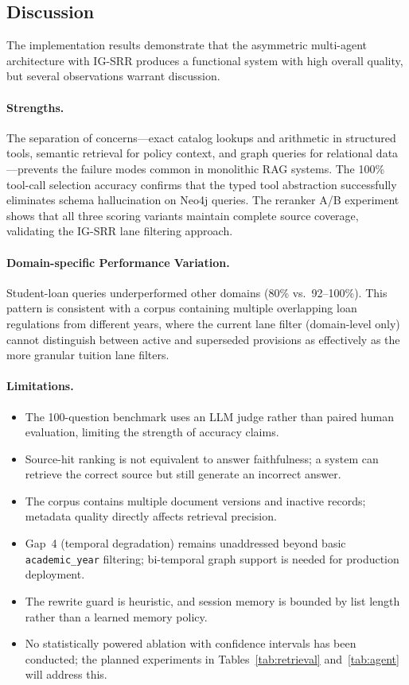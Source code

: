 \documentclass[runningheads]{llncs}
\begin{document}
\subsection{Discussion}
\label{sec:discussion}

The implementation results demonstrate that the asymmetric multi-agent architecture with IG-SRR produces a functional system with high overall quality, but several observations warrant discussion.

\paragraph{Strengths.}
The separation of concerns---exact catalog lookups and arithmetic in structured tools, semantic retrieval for policy context, and graph queries for relational data---prevents the failure modes common in monolithic RAG systems. The 100\% tool-call selection accuracy confirms that the typed tool abstraction successfully eliminates schema hallucination on Neo4j queries. The reranker A/B experiment shows that all three scoring variants maintain complete source coverage, validating the IG-SRR lane filtering approach.

\paragraph{Domain-specific Performance Variation.}
Student-loan queries underperformed other domains (80\% vs.\ 92--100\%). This pattern is consistent with a corpus containing multiple overlapping loan regulations from different years, where the current lane filter (domain-level only) cannot distinguish between active and superseded provisions as effectively as the more granular tuition lane filters.

\paragraph{Limitations.}
\begin{itemize}
    \item The 100-question benchmark uses an LLM judge rather than paired human evaluation, limiting the strength of accuracy claims.
    \item Source-hit ranking is not equivalent to answer faithfulness; a system can retrieve the correct source but still generate an incorrect answer.
    \item The corpus contains multiple document versions and inactive records; metadata quality directly affects retrieval precision.
    \item Gap~4 (temporal degradation) remains unaddressed beyond basic \texttt{academic\_year} filtering; bi-temporal graph support is needed for production deployment.
    \item The rewrite guard is heuristic, and session memory is bounded by list length rather than a learned memory policy.
    \item No statistically powered ablation with confidence intervals has been conducted; the planned experiments in Tables~\ref{tab:retrieval} and~\ref{tab:agent} will address this.
\end{itemize}
\end{document}
